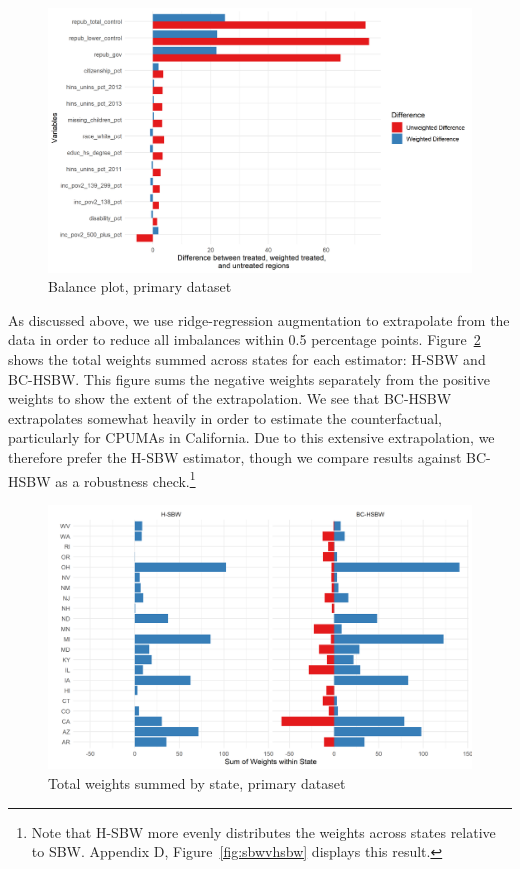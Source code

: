 \documentclass[aoas]{imsart}
\theoremstyle{plain}
\theoremstyle{remark}
\begin{document}
\begin{figure}[H]
\begin{center}
    \caption{Balance plot, primary dataset}
    \label{fig:loveplotc1}
    \includegraphics[scale=0.6]{01_Plots/balance-plot-etuc1.png}
\end{center}
\end{figure}

As discussed above, we use ridge-regression augmentation to extrapolate from the data in order to reduce all imbalances within 0.5 percentage points. Figure~\ref{fig:statewghts} shows the total weights summed across states for each estimator: H-SBW and BC-HSBW. This figure sums the negative weights separately from the positive weights to show the extent of the extrapolation. We see that BC-HSBW extrapolates somewhat heavily in order to estimate the counterfactual, particularly for CPUMAs in California. Due to this extensive extrapolation, we therefore prefer the H-SBW estimator, though we compare results against BC-HSBW as a robustness check.\footnote{Note that H-SBW more evenly distributes the weights across states relative to SBW. Appendix D, Figure~\ref{fig:sbwvhsbw} displays this result.}

\begin{figure}[H]
\begin{center}
    \caption{Total weights summed by state, primary dataset}
    \label{fig:statewghts}
    \includegraphics[scale=0.6]{01_Plots/weights-by-state-hsbw-c1.png}
\end{center}
\end{figure}
\end{document}
